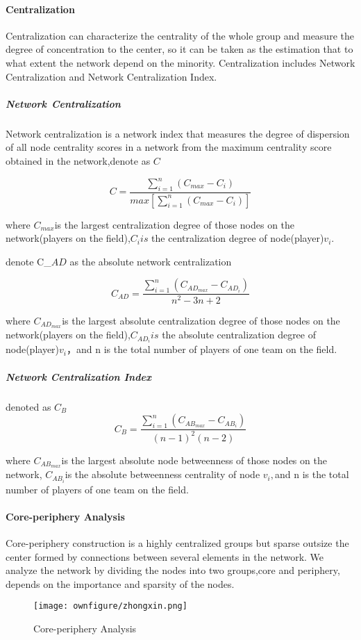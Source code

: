 \documentclass{mcmthesis}
\begin{document}
\paragraph{\textbf{Centralization}}

Centralization can characterize the centrality of the whole group
and measure the degree of concentration to the center, so it can be
taken as the estimation that to what extent the network depend on
the minority. Centralization includes Network Centralization and Network
Centralization Index.

\subparagraph{\textbf{Network Centralization}}

\noindent Network centralization is a network index that measures the degree
of dispersion of all node centrality scores in a network from the
maximum centrality score obtained in the network,denote as $C$

\[
C=\frac{\sum_{i=1}^{n}(C_{max}-C_{i})}{max\left[\sum_{i=1}^{n}(C_{max}-C_{i})\right]}
\]

where $C_{max}$is the largest centralization degree of those nodes
on the network(players on the field),$C_{i}is$ the centralization
degree of node(player)$v_{i}$.

denote C_${AD}$ as the absolute network centralization

\[
C_{AD}=\frac{\sum_{i=1}^{n}(C_{AD_{max}}-C_{AD_{i}})}{n^{2}-3n+2}
\]

where $C_{AD_{max}}$is the largest absolute centralization degree
of those nodes on the network(players on the field),$C_{AD_{i}}is$
the absolute centralization degree of node(player)$v_{i}$，and n is
the total number of players of one team on the field.

\subparagraph*{\textbf{Network Centralization Index}}

\noindent denoted as $C_{B}$
\[
C_{B}=\frac{\sum_{i=1}^{n}(C_{AB_{max}}-C_{AB_{i}})}{(n-1)^{2}(n-2)}
\]

where $C_{AB_{max}}$is the largest absolute node betweenness of those
nodes on the network, $C_{AB_{i}}$is the absolute betweenness centrality
of node $v_{i},$and n is the total number of players of one team
on the field.
\paragraph*{\textbf{Core-periphery Analysis}}
Core-periphery construction is a highly centralized groups but sparse
outsize the center formed by connections between several elements in the network.
We analyze the network by dividing the nodes into two groups,core and periphery,
depends on the importance and sparsity of the nodes.
\begin{figure}[h]
  \centering
  \texttt{[image: ownfigure/zhongxin.png]}
  \caption{Core-periphery Analysis}
 
\end{figure}
\end{document}
